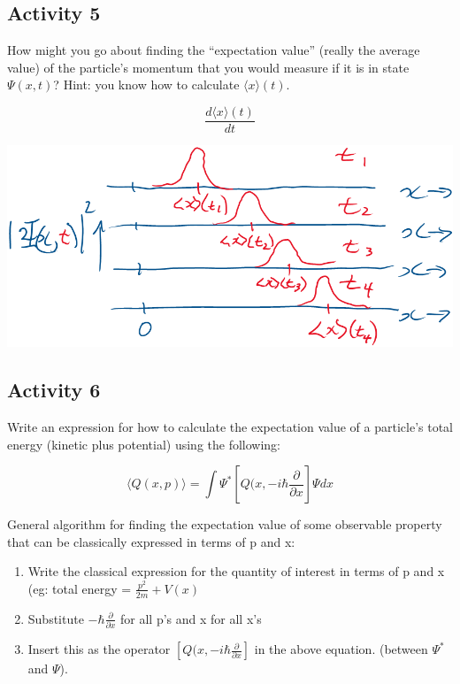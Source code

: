 \documentclass{article}
\begin{document}
\subsection{Activity 5}

How might you go about finding the “expectation value” (really the average value) of the particle’s momentum that you would measure if it is in state $\Psi(x,t)$?  Hint: you know how to calculate $\langle x \rangle (t)$. 

$$\frac{d \langle x \rangle (t)}{dt}$$

\includegraphics[width = 0.6 \textwidth]{Lecture03/2.png}


\subsection{Activity 6}

Write an expression for how to calculate the expectation value of a particle’s total energy (kinetic plus potential) using the following:

$$\langle Q(x,p) \rangle = \int \Psi^* \left[ Q(x, -i \hbar \frac{\partial}{\partial x} \right] \Psi dx$$

General algorithm for finding the expectation value of some observable property that can be classically expressed in terms of p and x:

\begin{enumerate}
    \item Write the classical expression for the quantity of interest in terms of p and x (eg: total energy = $\frac{p^2}{2m} + V(x)$
    \item Substitute $- \hbar \frac{\partial}{\partial x}$ for all p's and x for all x's
    \item Insert this as the operator $\left[ Q(x, -i \hbar \frac{\partial}{\partial x} \right]$ in the above equation. (between $\Psi^*$ and $\Psi$). 
\end{enumerate}
\end{document}
